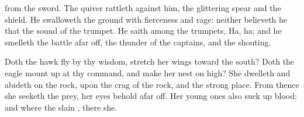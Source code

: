 {from the
sword.
The
quiver
rattleth against him, the
glittering
spear and the
shield.
He
swalloweth the
ground with
fierceness and
rage: neither
believeth he that
{} the
sound of the
trumpet.
He
saith
among the
trumpets,
Ha,
ha; and he
smelleth the
battle afar
off, the
thunder of the
captains, and the
shouting.
\par }{\PP {}Doth the
hawk
fly by thy
wisdom,
{}
stretch her
wings toward the
south?
Doth the
eagle mount
up at thy
command, and
make her
nest on
high?
She
dwelleth and
abideth on the
rock, upon the
crag of the
rock, and the strong
place.
From thence she
seeketh the
prey,
{} her
eyes
behold afar
off.
Her young
ones also suck
up
blood: and where the
slain
{}, there
{}
she.

}
